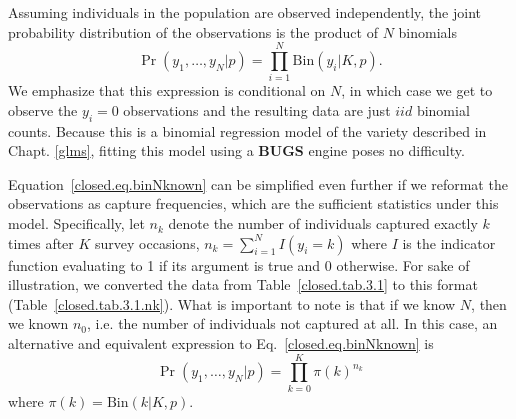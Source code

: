 Assuming individuals in the population are observed independently, the
joint probability distribution of the observations is the product of
$N$ binomials
\begin{equation}
  \Pr(y_1, \ldots, y_N | p) = \prod_{i=1}^N  \mathrm{Bin}(y_i | K, p).
  \label{closed.eq.binNknown}
\end{equation}
We emphasize that this expression is conditional on $N$, in which
case we get to observe the $y_i=0$ observations and the resulting data
are just $iid$ binomial counts. Because this is a binomial regression
model of the variety described in Chapt. \ref{glms}, fitting this model using
a {\bf BUGS} engine poses no difficulty.

Equation~\ref{closed.eq.binNknown} can be simplified even further if we reformat the
observations as capture frequencies, which are the sufficient
statistics under this model. Specifically, let $n_k$ denote the number
of individuals captured exactly $k$ times after $K$ survey occasions, $n_k = \sum_{i=1}^N
I(y_i = k)$ where $I$ is the indicator function evaluating to 1 if its
argument is true and 0 otherwise. For sake of illustration,
we converted the data from Table~\ref{closed.tab.3.1} to this
format (Table~\ref{closed.tab.3.1.nk}). What is important to note is
that if we know $N$, then we known $n_0$, i.e. the number of
individuals not captured at all. In this case, an alternative and equivalent expression to
Eq.~\ref{closed.eq.binNknown} is
\begin{equation}
  \Pr(y_1, \ldots, y_N | p) = \prod_{k=0}^K  \pi(k)^{n_k}
  \label{closed.eq.multiNknown}
\end{equation}
where $\pi(k) = \mathrm{Bin}(k | K,p)$.

